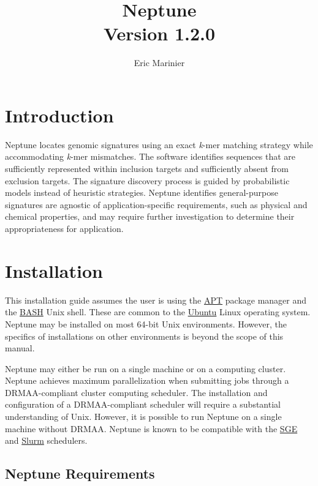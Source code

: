 \documentclass[a4paper,10pt]{article}
\title{Neptune\\ \normalsize Version 1.2.0}
\author{Eric Marinier}
\begin{document}
\maketitle

\newpage
\tableofcontents

\newpage
\section{Introduction}

Neptune locates genomic signatures using an exact \textit{k}-mer matching strategy while accommodating \textit{k}-mer mismatches. The software identifies sequences that are sufficiently represented within inclusion targets and sufficiently absent from exclusion targets. The signature discovery process is guided by probabilistic models instead of heuristic strategies. Neptune identifies general-purpose signatures are agnostic of application-specific requirements, such as physical and chemical properties, and may require further investigation to determine their appropriateness for application.

\newpage
\section{Installation}

This installation guide assumes the user is using the \href{https://help.ubuntu.com/community/AptGet/Howto}{APT} package manager and the \href{https://en.wikipedia.org/wiki/Bash_(Unix_shell)}{BASH} Unix shell. These are common to the \href{https://en.wikipedia.org/wiki/Ubuntu_(operating_system)}{Ubuntu} Linux operating system. Neptune may be installed on most 64-bit Unix environments. However, the specifics of installations on other environments is beyond the scope of this manual.

Neptune may either be run on a single machine or on a computing cluster. Neptune achieves maximum parallelization when submitting jobs through a DRMAA-compliant cluster computing scheduler. The installation and configuration of a DRMAA-compliant scheduler will require a substantial understanding of Unix. However, it is possible to run Neptune on a single machine without DRMAA. Neptune is known to be compatible with the \href{http://gridscheduler.sourceforge.net/}{SGE} and \href{http://slurm.schedmd.com/}{Slurm} schedulers.

\subsection{Neptune Requirements}
\end{document}
